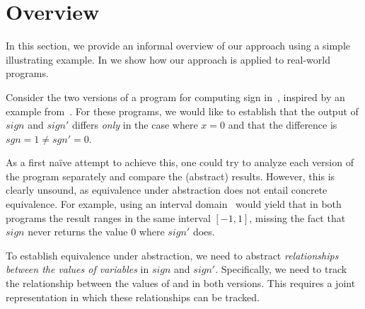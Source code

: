 \section{Overview}

In this section, we provide an informal overview of our approach using a simple illustrating example. In  we show how our approach is applied to real-world programs. 

Consider the two versions of a program for computing sign in~, inspired by an example from~\cite{MauborgneRival07}. For these programs, we would like to establish that the output of $sign$ and $sign'$ differs \emph{only} in the case where $x=0$ and that the difference is $sgn = 1 \neq sgn' = 0$. 


As a first na\"{i}ve attempt to achieve this, one could try to analyze each version of the program separately and compare the (abstract) results. However, this is clearly unsound, as equivalence under abstraction does not entail concrete equivalence. For example, using an interval domain~\cite{CousotHalbwachs78} would yield that in both programs the result ranges in the same interval $[-1,1]$, missing the fact that $sign$ never returns the value $0$ where $sign'$ does.


To establish equivalence under abstraction, we need to abstract \emph{relationships between the values of variables} in $sign$ and $sign'$. Specifically, we need to track the relationship between the values of  and  in both versions. This requires a joint representation in which these relationships can be tracked.

